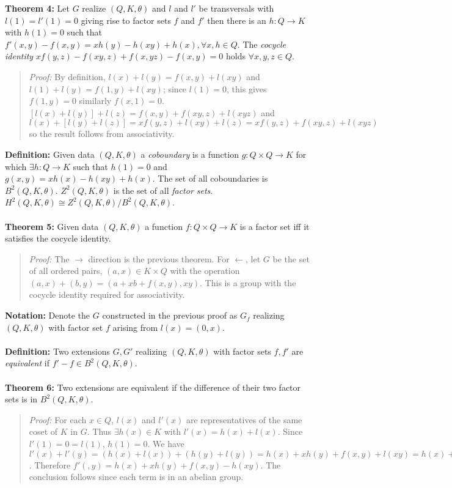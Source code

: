 {\bf Theorem 4:}
Let $G$ realize $(Q, K, \theta )$ and $l$ and $l'$ be transversals with
$l(1)=l'(1)=0$ giving rise to factor sets $f$ and $f'$ then there is an
$h:Q \rightarrow K$ with $h(1)=0$ such that 
$f'(x,y)-f(x,y)= xh(y)-h(xy)+h(x), \forall x,h \in Q$.
The \emph{cocycle identity} $xf(y,z)-f(xy,z)+f(x,yz)-f(x,y)=0$ holds $\forall x,y,z \in Q$.
\begin{quote}
\emph{Proof:}  
By definition, 
$l(x) + l(y)= f(x,y) + l(xy)$
and
$l(1) + l(y)= f(1,y) + l(xy)$; since $l(1)=0$, this gives $f(1,y)=0$ similarly $f(x,1)=0$.
$[l(x)+l(y)]+l(z) = f(x,y)+f(xy,z)+l(xyz)$ and
$l(x)+[l(y)+l(z)] = xf(y,z)+l(xy)+l(z)= xf(y,z)+f(xy,z)+l(xyz)$ so the result follows from associativity.
\end{quote}
{\bf Definition:}  Given data $(Q, K, \theta)$ a \emph{coboundary} is a function
$g: Q \times Q \rightarrow K$ for which $\exists h: Q \rightarrow K$ such that
$h(1)=0$ and $g(x,y)= xh(x)-h(xy)+h(x)$.
The set of all coboundaries is $B^2 (Q,K,\theta)$.
$Z^2 (Q, K, \theta)$ is the set of all \emph{ factor sets}.
$H^2 (Q, K, \theta) \cong Z^2 (Q, K, \theta) / B^2 (Q, K, \theta)$.
\\
\\
{\bf Theorem 5:} 
Given data $(Q, K, \theta)$ a function $f: Q \times Q \rightarrow K$ is a factor set iff it satisfies the
cocycle identity.
\begin{quote}
\emph{Proof:}  
The $\rightarrow$ direction is the previous theorem.  For $\leftarrow$, let $G$ be the set of all ordered pairs,
$(a,x) \in K \times Q$ with the operation
$(a,x)+(b,y)= (a+xb+f(x,y), xy)$.  This is a group with the cocycle identity required for associativity.
\end{quote}
{\bf Notation:} Denote the $G$ constructed in the previous proof as $G_f$ realizing
$(Q, K, \theta )$ with factor set $f$ arising from $l(x)= (0,x)$.
\\
\\
{\bf Definition:}
Two extensions $G, G'$ realizing
$(Q, K, \theta )$ with factor sets $f, f'$ are \emph{equivalent} if $f'-f \in B^2(Q, K, \theta)$.
\\
\\
{\bf Theorem 6:}
Two extensions are equivalent if the difference of
their two factor sets is in $B^2 (Q, K, \theta)$.
\begin{quote}
\emph{Proof:}  
For each $x \in Q$, $l(x)$ and $l'(x)$ are representatives of the same coset
of $K$ in $G$.  Thus $\exists h(x) \in K$ with $l'(x)= h(x) + l(x)$.  Since
$l'(1)= 0 = l(1)$, $h(1) = 0$.  We have
$l'(x) + l'(y) =
(h(x) + l(x)) +
(h(y) + l(y)) =
h(x) + x h(y) + f(x, y) + l(xy) =
h(x) + x h(y) + f(x, y) - h(xy) + l'(xy)$.  Therefore
$f'(, y)= h(x) + x h(y) + f(x, y) - h(xy)$.  The conclusion follows since each term
is in an abelian group.
\end{quote}
